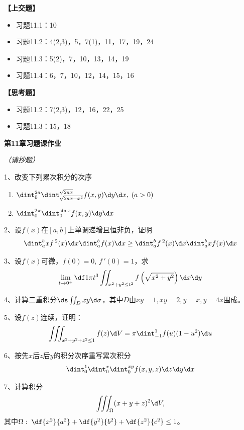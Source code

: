 {\bf 【上交题】}

\begin{itemize}
  \setlength{\itemindent}{1cm}
  \item 习题11.1：10
  \item 习题11.2：4(2,3)，5，7(1)，11，17，19，24
  \item 习题11.3：5(2)，7，10，13，14，19
  \item 习题11.4：6，7，10，12，14，15，16
\end{itemize}

{\bf 【思考题】}

\begin{itemize}
  \setlength{\itemindent}{1cm}
  \item 习题11.2：7(2,3)，12，16，22，25
  \item 习题11.3：15，18
\end{itemize}

\newpage

{\Large\bf 第11章习题课作业}

{\it （请抄题）}

\bigskip

1、改变下列累次积分的次序
\begin{enumerate}[(1)]
  \setlength{\itemindent}{1cm}
  \item $\dint_0^{2a}\dint_{\sqrt{2ax-x^2}}^{\sqrt{2ax}}
  f(x,y)\d y\d x,\;(a>0)$ 
  \item $\dint_0^{2\pi}\dint_0^{\sin x}f(x,y)\d y\d x$
\end{enumerate}

2、设$f(x)$在$[a,b]$上单调递增且恒非负，证明
$${\dint_a^b xf\,^2(x)\d x}{\dint_a^b f(x)\d x}\geq
{\dint_a^b f\,^2(x)\d x}{\dint_a^b xf(x)\d x}$$

3、设$f(x)$可微，$f(0)=0,\,f\,'(0)=1$，求
$$\lim\limits_{t\to 0^+}\df 1{\pi t^3}
\iint_{x^2+y^2\leq t^2}f\left(
\sqrt{x^2+y^2}\right)\d x\d y$$

4、计算二重积分$\ds\iint_D xy\d\sigma$，其中$D$由$xy=1,xy=2,y=x,y=4x$围成。 

5、设$f(z)$连续，证明：
$$\iiint_{x^2+y^2+z^2\leq 1}f(z)\d V=\pi\dint_{-1}^1f(u)(1-u^2)\d u$$

6、按先$x$后$z$后$y$的积分次序重写累次积分
$$\dint_0^1\dint_0^x\dint_0^{xy}f(x,y,z)\d z\d y\d x$$

7、计算积分
$$\iiint_{\Omega}(x+y+z)^2\d V,$$
其中$\Omega:\;\df{x^2}{a^2}+\df{y^2}{b^2}+\df{z^2}{c^2}\leq 1$。

\bigskip

